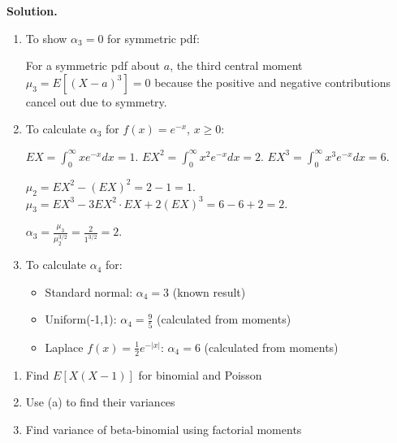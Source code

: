 \noindent\textbf{Solution.}
\begin{enumerate}[label=(\alph*)]
    \item To show $\alpha_3=0$ for symmetric pdf:
    
    For a symmetric pdf about $a$, the third central moment $\mu_3 = E[(X-a)^3] = 0$ because the positive and negative contributions cancel out due to symmetry.
    
    \item To calculate $\alpha_3$ for $f(x)=e^{-x}$, $x\geq0$:
    
    $EX = \int_0^\infty xe^{-x}dx = 1$.
    $EX^2 = \int_0^\infty x^2e^{-x}dx = 2$.
    $EX^3 = \int_0^\infty x^3e^{-x}dx = 6$.
    
    $\mu_2 = EX^2 - (EX)^2 = 2 - 1 = 1$.
    $\mu_3 = EX^3 - 3EX^2 \cdot EX + 2(EX)^3 = 6 - 6 + 2 = 2$.
    
    $\alpha_3 = \frac{\mu_3}{\mu_2^{3/2}} = \frac{2}{1^{3/2}} = 2$.
    
    \item To calculate $\alpha_4$ for:
    \begin{itemize}
        \item Standard normal: $\alpha_4 = 3$ (known result)
        \item Uniform(-1,1): $\alpha_4 = \frac{9}{5}$ (calculated from moments)
        \item Laplace $f(x)=\frac{1}{2}e^{-|x|}$: $\alpha_4 = 6$ (calculated from moments)
    \end{itemize}
\end{enumerate}

\begin{problembox}
\begin{enumerate}[label=(\alph*)]
    \item Find $E[X(X-1)]$ for binomial and Poisson
    \item Use (a) to find their variances
    \item Find variance of beta-binomial using factorial moments
\end{enumerate}
\end{problembox}

